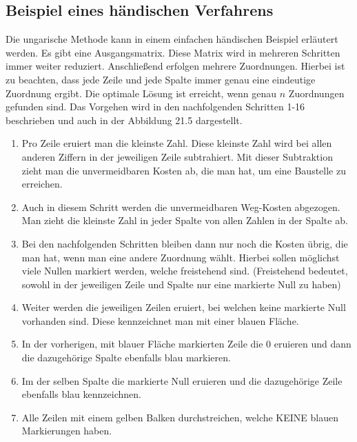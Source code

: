 \subsection{Beispiel eines händischen Verfahrens
\label{munkres:subsection:malorum}}

Die ungarische Methode kann in einem einfachen händischen Beispiel erläutert werden. Es gibt eine Ausgangsmatrix. Diese Matrix wird in mehreren Schritten immer weiter reduziert. Anschließend erfolgen mehrere Zuordnungen. Hierbei ist zu beachten, dass jede Zeile und jede Spalte immer genau eine eindeutige Zuordnung ergibt. Die optimale Lösung ist erreicht, wenn genau $n$ Zuordnungen gefunden sind. Das Vorgehen wird in den nachfolgenden Schritten 1-16 beschrieben und auch in der Abbildung 21.5 dargestellt. 

\begin{enumerate}
\item Pro Zeile eruiert man die kleinste Zahl. Diese kleinste Zahl wird bei
allen anderen Ziffern in der jeweiligen Zeile subtrahiert. Mit dieser Subtraktion zieht man die unvermeidbaren Kosten ab, die man hat, um eine Baustelle zu erreichen. 

\item Auch in diesem Schritt werden die unvermeidbaren Weg-Kosten abgezogen. Man zieht die kleinste Zahl in jeder Spalte von allen Zahlen in der Spalte ab.

\item Bei den nachfolgenden Schritten bleiben dann nur noch die Kosten übrig, die man hat, wenn man eine andere Zuordnung wählt. Hierbei sollen möglichst viele Nullen markiert werden, welche freistehend sind.
(Freistehend bedeutet, sowohl in der jeweiligen Zeile und Spalte nur
eine markierte Null zu haben)

\item Weiter werden die jeweiligen Zeilen eruiert, bei welchen keine markierte Null vorhanden sind. Diese kennzeichnet man mit einer blauen Fläche.

\item In der vorherigen, mit blauer Fläche markierten Zeile die 0 eruieren und dann die dazugehörige Spalte ebenfalls
blau markieren.

\item Im der selben Spalte die markierte Null eruieren und die dazugehörige
Zeile ebenfalls blau kennzeichnen.

\item Alle Zeilen mit einem gelben Balken durchstreichen, welche KEINE blauen Markierungen haben.


\end{enumerate}
